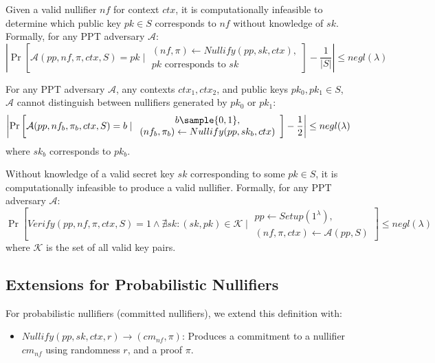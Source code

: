 \begin{property}[Pseudonymity]
Given a valid nullifier $nf$ for context $ctx$, it is computationally infeasible to determine which public key $pk \in S$ corresponds to $nf$ without knowledge of $sk$. Formally, for any PPT adversary $\mathcal{A}$:
$$\left|\Pr\left[\mathcal{A}(pp, nf, \pi, ctx, S) = pk \mid \begin{array}{c} (nf, \pi) \leftarrow Nullify(pp, sk, ctx), \\ pk \text{ corresponds to } sk \end{array}\right] - \frac{1}{|S|}\right| \leq negl(\lambda)$$
\end{property}

\begin{property}[Indistinguishability]
For any PPT adversary $\mathcal{A}$, any contexts $ctx_1, ctx_2$, and public keys $pk_0, pk_1 \in S$, $\mathcal{A}$ cannot distinguish between nullifiers generated by $pk_0$ or $pk_1$:
$$\left|\Pr\left[\mathcal{A}(pp, nf_b, \pi_b, ctx, S) = b \mid \begin{array}{c} b \sample \{0,1\}, \\ (nf_b, \pi_b) \leftarrow Nullify(pp, sk_b, ctx) \end{array}\right] - \frac{1}{2}\right| \leq negl(\lambda)$$
where $sk_b$ corresponds to $pk_b$.
\end{property}

\begin{property}
Without knowledge of a valid secret key $sk$ corresponding to some $pk \in S$, it is computationally infeasible to produce a valid nullifier. Formally, for any PPT adversary $\mathcal{A}$:
$$\Pr\left[Verify(pp, nf, \pi, ctx, S) = 1 \land \nexists sk: (sk,pk) \in \mathcal{K} \mid \begin{array}{c} pp \leftarrow Setup(1^\lambda), \\ (nf, \pi, ctx) \leftarrow \mathcal{A}(pp, S) \end{array}\right] \leq negl(\lambda)$$
where $\mathcal{K}$ is the set of all valid key pairs.
\end{property}

\subsection{Extensions for Probabilistic Nullifiers}

For probabilistic nullifiers (committed nullifiers), we extend this definition with:

\begin{itemize}
    \item $Nullify(pp, sk, ctx, r) \rightarrow (cm_{nf}, \pi)$: Produces a commitment to a nullifier $cm_{nf}$ using randomness $r$, and a proof $\pi$.
\end{itemize}

